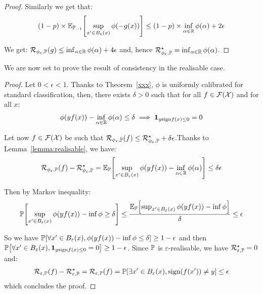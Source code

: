 \begin{proof}
Similarly we get that:
\begin{align*}
(1-p)\times\EE_{\PP_{-1}}\left[\sup_{x'\in B_\varepsilon(x)}\phi(-g(x))\right] \leq(1-p)\times\inf_{\alpha\in\RR}\phi(\alpha)+2\epsilon
\end{align*}

We get: $\mathcal{R}_{\phi_\varepsilon,\mathbb{P}}(g)\leq \inf_{\alpha\in\mathbb{R}}\phi(\alpha)+4\epsilon$ and, hence $\mathcal{R}^\star_{\phi_\varepsilon,\mathbb{P}}=\inf_{\alpha\in\mathbb{R}}\phi(\alpha)$.
\end{proof}



We are now set to prove the result of consistency in the realisable case.
\begin{proof}
Let $0<\epsilon<1$. Thanks to Theorem~\ref{xxx}, $\phi$ is uniformly calibrated for standard classification, then, there exists $\delta>0$ such that for all $f\in\mathcal{F}(\mathcal{X})$ and for all $x$:
\begin{align*}
    \phi(yf(x))-\inf_{\alpha\in\mathbb{R}}\phi(\alpha)\leq \delta \implies \mathbf{1}_{y\text{sign}f(x)\leq 0} = 0
\end{align*}

Let now $f\in\mathcal{F}(\mathcal{X})$ be such that  $\mathcal{R}_{\phi_\varepsilon,\mathbb{P}}(f)\leq \mathcal{R}_{\phi_\varepsilon,\mathbb{P}}^\star+\delta\epsilon$.Thanks to Lemma~\ref{lemma:realisable},  we have:
\begin{align*}
\risk_{\phi_\varepsilon,\PP}(f)- \risk_{\phi_\varepsilon,\PP}^\star = \EE_{\PP}\left[\sup_{x'\in B_\varepsilon(x)}\phi(yf(x))-\inf_{\alpha \in \RR} \phi(\alpha)\right]\leq\delta\epsilon
\end{align*}

Then by Markov inequality:
\begin{align*}
    \PP\left[\sup_{x'\in B_\varepsilon(x)}\phi(yf(x))-\inf \phi\geq\delta\right]\leq\frac{\EE_{\PP}\left[\sup_{x'\in B_\varepsilon(x)}\phi(yf(x))-\inf \phi\right]}{\delta}\leq \epsilon
\end{align*}

So we have $\PP\left[\forall x'\in B_\varepsilon(x),\phi(yf(x))-\inf \phi\leq\delta\right]\geq1-\epsilon$ and then $\PP\left[\forall x'\in B_\varepsilon(x),\mathbf{1}_{y\text{sign}f(x)\leq 0} = 0\right]\geq1-\epsilon$. Since $\mathbb{P}$ is $\varepsilon$-realisable, we have $\mathcal{R}_{\varepsilon,\mathbb{P}}^\star=0$ and:
\begin{align*}
        \risk_{\varepsilon,\PP}(f)- \risk_{\varepsilon,\PP}^\star =  \risk_{\varepsilon,\PP}(f) =\PP\left[\exists x'\in B_\varepsilon(x), \text{sign}(f(x'))\neq y\right]\leq \epsilon
\end{align*}
which concludes the proof.
\end{proof}




